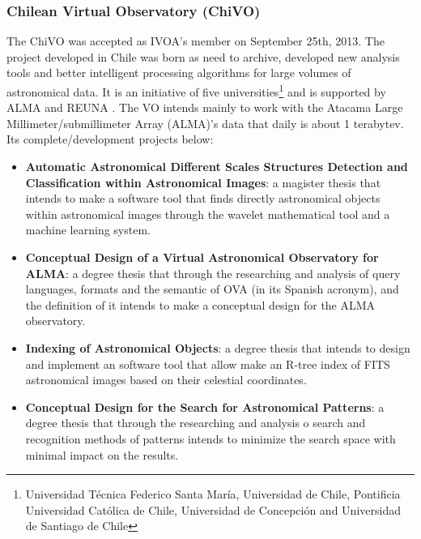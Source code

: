 \subsubsection{Chilean Virtual Observatory (ChiVO)}
The ChiVO \cite{website:chivo-home} was accepted as IVOA's member on September
25th, 2013. The project developed in Chile was born as need to archive,
developed new analysis tools and better intelligent processing algorithms for
large volumes of astronomical data. It is an initiative of five
universities\footnote{Universidad T\'{e}cnica Federico Santa Mar\'{i}a,
Universidad de Chile, Pontificia Universidad Cat\'{o}lica de Chile, Universidad
de Concepci\'{o}n and Universidad de Santiago de Chile} and is supported by ALMA
\cite{website:alma-home} and REUNA \cite{website:reuna-home}. The VO intends
mainly to work with the Atacama Large Millimeter/submillimeter Array (ALMA)'s
data that daily is about 1 terabytev. Its complete/development projects below:

\begin{itemize}
\item \textbf{Automatic Astronomical Different Scales Structures Detection and
Classification within Astronomical Images}:
a magister thesis that intends to make a software tool that finds directly
astronomical objects within astronomical images through the wavelet mathematical
tool and a machine learning system.

\item \textbf{Conceptual Design of a Virtual Astronomical Observatory for ALMA}:
a degree thesis that through the researching and analysis of query languages,
formats and the semantic of OVA (in its Spanish acronym), and the definition of
it intends to make a conceptual design for the ALMA observatory.

\item \textbf{Indexing of Astronomical Objects}:
a degree thesis that intends to design and implement an software tool that allow
make an R-tree index of FITS astronomical images based on their celestial
coordinates.

\item  \textbf{Conceptual Design for the Search for Astronomical Patterns}:
 a degree thesis that through the researching and analysis o search and
recognition methods of patterns intends to minimize the search space with
minimal impact on the results. 
\end{itemize}


